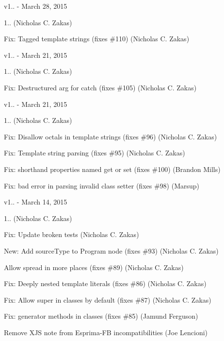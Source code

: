 v1.. -\/ March 28, 2015


\begin{DoxyItemize}
\item 1.. (Nicholas C. Zakas)
\item Fix\+: Tagged template strings (fixes \#110) (Nicholas C. Zakas)
\end{DoxyItemize}

v1.. -\/ March 21, 2015


\begin{DoxyItemize}
\item 1.. (Nicholas C. Zakas)
\item Fix\+: Destructured arg for catch (fixes \#105) (Nicholas C. Zakas)
\end{DoxyItemize}

v1.. -\/ March 21, 2015


\begin{DoxyItemize}
\item 1.. (Nicholas C. Zakas)
\item Fix\+: Disallow octals in template strings (fixes \#96) (Nicholas C. Zakas)
\item Fix\+: Template string parsing (fixes \#95) (Nicholas C. Zakas)
\item Fix\+: shorthand properties named get or set (fixes \#100) (Brandon Mills)
\item Fix\+: bad error in parsing invalid class setter (fixes \#98) (Marsup)
\end{DoxyItemize}

v1.. -\/ March 14, 2015


\begin{DoxyItemize}
\item 1.. (Nicholas C. Zakas)
\item Fix\+: Update broken tests (Nicholas C. Zakas)
\item New\+: Add source\+Type to Program node (fixes \#93) (Nicholas C. Zakas)
\item Allow spread in more places (fixes \#89) (Nicholas C. Zakas)
\item Fix\+: Deeply nested template literals (fixes \#86) (Nicholas C. Zakas)
\item Fix\+: Allow super in classes by default (fixes \#87) (Nicholas C. Zakas)
\item Fix\+: generator methods in classes (fixes \#85) (Jamund Ferguson)
\item Remove XJS note from Esprima-\/\+FB incompatibilities (Joe Lencioni)
\end{DoxyItemize}

